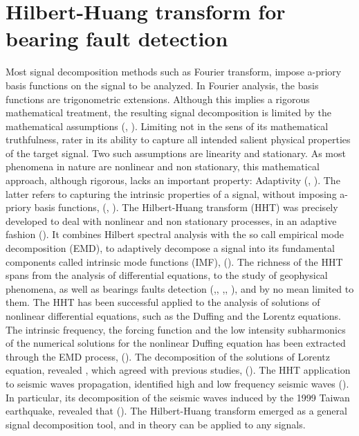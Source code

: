 \documentclass[../Main/thesis.tex]{subfiles}
\begin{document}
\chapter[Hilbert-Huang transform applied to bearing fault detection]{Hilbert-Huang transform for bearing fault detection}
\label{sec:hht}

Most signal decomposition methods such as Fourier transform, impose a-priory basis functions on the signal to be analyzed. In Fourier analysis, the basis functions are trigonometric extensions. Although this implies a rigorous mathematical treatment, the resulting signal decomposition is limited by the mathematical assumptions (\cite{huang98}, \cite{huang08}). Limiting not in the sens of its mathematical truthfulness, rater in its ability to capture all intended salient physical properties of the target signal. Two such assumptions are linearity and stationary. As most phenomena in nature are nonlinear and non stationary, this mathematical approach, although rigorous, lacks an important property: Adaptivity (\cite{huang98}, \cite{huang08}). The latter refers to capturing the intrinsic properties of a signal, without imposing a-priory basis functions, (\cite{huang98}, \cite{huang08}). 
\justify 
The Hilbert-Huang transform (HHT) was precisely developed to deal with nonlinear and non stationary processes, in an adaptive fashion (\cite{huang98}). It combines Hilbert spectral analysis with the so call empirical mode decomposition (EMD), to adaptively decompose a signal into its fundamental components called intrinsic mode functions (IMF), (\cite{huang98}).
The richness of the HHT spans from the analysis of differential equations, to the study of geophysical phenomena, as well as bearings faults detection (\cite{huang08},\cite{li2009}, \cite{yan2006} ,\cite{soualhi2015}, \cite{sallo2019}), and by no mean limited to them.
\justify
 The HHT has been successful applied to the analysis of solutions of nonlinear differential equations, such as the Duffing and the Lorentz equations. The intrinsic frequency, the forcing function and the low intensity subharmonics of the numerical solutions for the nonlinear Duffing equation has been extracted through the EMD process, (\cite{huang98}).
 \justify
  The decomposition of the solutions of Lorentz equation, revealed , which agreed with previous studies, (\cite{huang98}). The HHT application to seismic waves propagation, identified high and low frequency seismic waves (\cite{vasudevan2000}). In particular, its decomposition of the seismic waves induced by the 1999 Taiwan earthquake, revealed that  (\cite{huang2001}). The Hilbert-Huang transform emerged as a general signal decomposition tool, and in theory can be applied to any signals.
\end{document}
